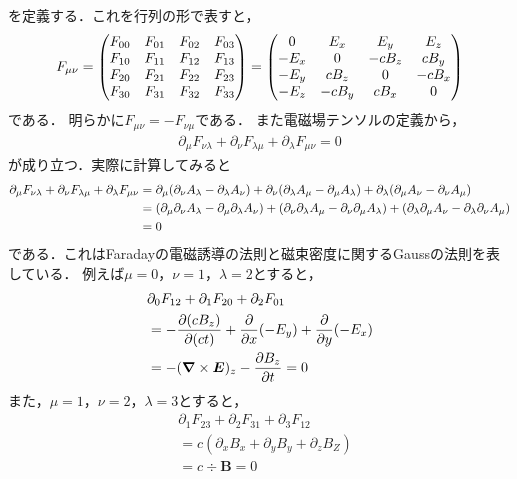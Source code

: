 \documentclass{report}
\begin{document}
    を定義する．これを行列の形で表すと，
    \begin{align}
      F_{\mu\nu}=
      \mqty(
        F_{00} & F_{01} & F_{02} & F_{03}\\
        F_{10} & F_{11} & F_{12} & F_{13}\\
        F_{20} & F_{21} & F_{22} & F_{23}\\
        F_{30} & F_{31} & F_{32} & F_{33}
      )
      =
      \mqty(
        0 & E_x & E_y & E_z \\
        -E_x & 0 & -cB_z & cB_y\\
        -E_y & cB_z & 0 & -cB_x\\
        -E_z& -cB_y & cB_x & 0
      )
    \end{align}
    である．
    明らかに$F_{\mu\nu} = -F_{\nu\mu}$である．
    また電磁場テンソルの定義から，
    \begin{align}
      \partial_{\mu} F_{\nu\lambda} + \partial_{\nu} F_{\lambda\mu} + \partial_{\lambda} F_{\mu\nu} = 0
    \end{align}
    が成り立つ．実際に計算してみると
    \begin{align}
      \partial_{\mu} F_{\nu\lambda} + \partial_{\nu} F_{\lambda\mu} + \partial_{\lambda} F_{\mu\nu} &= 
      \partial_{\mu}\qty(\partial_{\nu}A_{\lambda} - \partial_{\lambda} A_{\nu}) + \partial_{\nu}\qty(\partial_{\lambda}A_{\mu} - \partial_{\mu} A_{\lambda}) + \partial_{\lambda}\qty(\partial_{\mu}A_{\nu} - \partial_{\nu} A_{\mu}) \\ 
      &= (\partial_{\mu}\partial_{\nu} A_\lambda - \partial_{\mu}\partial_{\lambda} A_{\nu}) + (\partial_{\nu}\partial_{\lambda} A_{\mu} - \partial_{\nu}\partial_{\mu} A_\lambda)
      + (\partial_{\lambda}\partial_{\mu} A_{\nu} - \partial_{\lambda}\partial_{\nu} A_{\mu}) \\
      &= 0
    \end{align}
    である．これはFaradayの電磁誘導の法則と磁束密度に関するGaussの法則を表している．
    例えば$\mu = 0$，$\nu = 1$，$\lambda = 2$とすると，
    \begin{align}
      &\partial_0 F_{12} + \partial_1 F_{20} + \partial_2 F_{01}\\
      &= -\pdv{(cB_z)}{(ct)} + \pdv{x}(-E_y) + \pdv{y}(-E_x)\\
      &= -(\grad\times \bm{E})_z - \pdv{B_z}{t} = 0
    \end{align}
    また，$\mu = 1$，$\nu = 2$，$\lambda = 3$とすると，
    \begin{align}
      &\partial_1 F_{23} + \partial_2 F_{31} + \partial_3 F_{12}\\
      &= c(\partial_xB_x + \partial_yB_y + \partial_zB_Z)\\
      &= c\div\bm{B} = 0
    \end{align}
\end{document}
